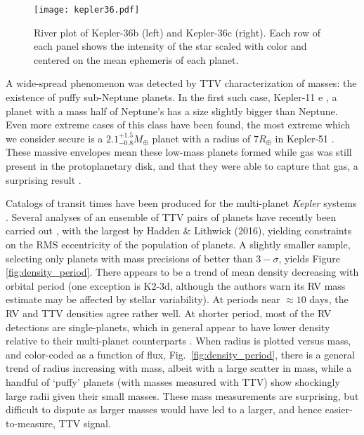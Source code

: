 \documentclass[graybox,natbib,nosecnum]{svmult}
\begin{document}
\begin{figure}
\centerline{
\texttt{[image: kepler36.pdf]}}
\caption{River plot of Kepler-36b (left) and Kepler-36c (right). Each row of each panel shows the intensity
of the star scaled with color and centered on the mean ephemeris of each planet.}
\label{fig:kep36}
\end{figure}

A wide-spread phenomenon was detected by TTV characterization of masses: the existence of puffy sub-Neptune planets.  In the first such case, Kepler-11 e \citep{2011Natur.470...53L}, a planet with a mass half of Neptune's has a size slightly bigger than Neptune.  Even more extreme cases of this class have been found, the most extreme which we consider secure is a $2.1^{+1.5}_{-0.8} M_\oplus$ planet with a radius of $7 R_\oplus$ in Kepler-51 \citep{2014ApJ...783...53M}.  These massive envelopes mean these low-mass planets formed while gas was still present in the protoplanetary disk, and that they were able to capture that gas, a surprising result \citep[e.g.][]{2016ApJ...817...90L,2016ApJ...825...29G}. 

Catalogs of transit times have been produced for the multi-planet \emph{Kepler} systems \citep{2013ApJS..208...16M,Rowe2015,2016ApJS..225....9H}. Several analyses of an ensemble of TTV pairs of planets have recently been carried out \citep{2014ApJ...787...80H,2013ApJS..208...22X,2014ApJS..210...25X,2016ApJ...820...39J}, with the largest by Hadden \& Lithwick (2016), yielding constraints on the RMS eccentricity of the population of planets.  A slightly smaller sample, selecting only planets with mass precisions of better than $3-\sigma$, yields Figure \ref{fig:density_period}.  There appears to be a trend of mean density decreasing with orbital period (one exception is K2-3d, although the authors warn its RV mass estimate may be affected by stellar variability).  At periods near $\approx 10$ days, the RV and TTV densities agree rather well.  At shorter period, most of the RV detections are single-planets, which in general appear to have lower density relative to their multi-planet counterparts \citep{Steffen2016,2017ApJ...839L...8M}.  When radius is plotted versus mass, and color-coded as a function of flux, Fig.\ \ref{fig:density_period}, there is a general trend of radius increasing with mass, albeit with a large scatter in mass, while a handful of `puffy' planets (with masses measured with TTV) show shockingly large radii given their small masses.  These mass measurements are surprising, but difficult to dispute as larger masses would have led to a larger, and hence easier-to-measure, TTV signal.
\end{document}
